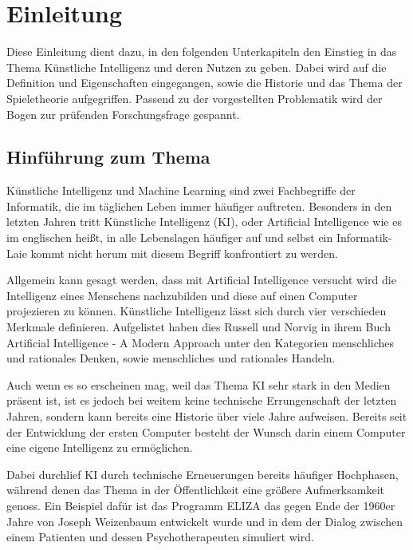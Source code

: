 
\chapter{Einleitung}
Diese Einleitung dient dazu, in den folgenden Unterkapiteln den Einstieg in das Thema Künstliche Intelligenz und deren Nutzen zu geben. Dabei wird auf die Definition und Eigenschaften eingegangen, sowie die Historie und das Thema der Spieletheorie aufgegriffen. Passend zu der vorgestellten Problematik wird der Bogen zur prüfenden Forschungsfrage gespannt.

\section{Hinführung zum Thema}
Künstliche Intelligenz und Machine Learning sind zwei Fachbegriffe der Informatik, die im täglichen Leben immer häufiger auftreten. Besonders in den letzten Jahren tritt Künstliche Intelligenz (\acs{KI}), oder Artificial Intelligence wie es im englischen heißt, in alle Lebenslagen häufiger auf und selbst ein Informatik-Laie kommt nicht herum mit diesem Begriff konfrontiert zu werden. 

Allgemein kann gesagt werden, dass mit Artificial Intelligence versucht wird die Intelligenz eines Menschens nachzubilden und diese auf einen Computer projezieren zu können.  Künstliche Intelligenz lässt sich durch vier verschieden Merkmale definieren. Aufgelistet haben dies Russell und Norvig in ihrem Buch Artificial Intelligence - A Modern Approach unter den Kategorien menschliches und rationales Denken, sowie menschliches und rationales Handeln.\cite{Russell2010}

Auch wenn es so erscheinen mag, weil das Thema KI sehr stark in den Medien präsent ist, ist es jedoch bei weitem keine technische Errungenschaft der letzten Jahren, sondern kann bereits eine Historie über viele Jahre aufweisen. Bereits seit der Entwicklung der ersten Computer besteht der Wunsch darin einem Computer eine eigene Intelligenz zu ermöglichen.

Dabei durchlief KI durch technische Erneuerungen bereits häufiger Hochphasen, während denen das Thema in der Öffentlichkeit eine größere Aufmerksamkeit genoss. Ein Beispiel dafür ist das Programm ELIZA das gegen Ende der 1960er Jahre von Joseph Weizenbaum entwickelt wurde und in dem der Dialog zwischen einem Patienten und dessen Psychotherapeuten simuliert wird.\cite{Weizenbaum1966}

